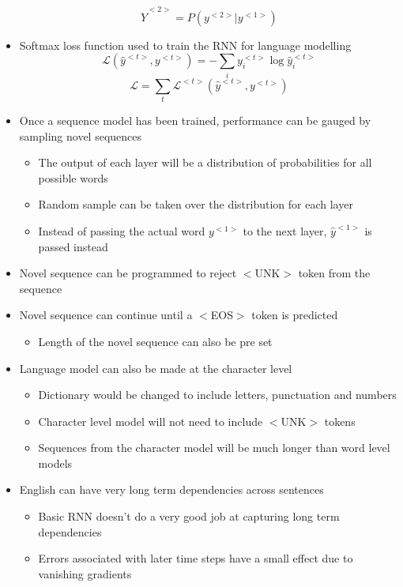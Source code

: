 \documentclass[12pt, letterpaper]{article}
\begin{document}
\begin{itemize}
\begin{itemize}
        \end{itemize}
        $$\hat{Y}^{<2>}=P(y^{<2>}|y^{<1>})$$ 
        \item Softmax loss function used to train the RNN for language modelling
        $$\mathcal{L}(\hat{y}^{<t>},y^{<t>})=-\sum_iy_i^{<t>}\log\hat{y}_i^{<t>}$$ 
        $$\mathcal{L}=\sum_t\mathcal{L}^{<t>}(\hat{y}^{<t>},y^{<t>})$$
        \item Once a sequence model has been trained, performance can be gauged by sampling novel sequences
        \begin{itemize}
            \item The output of each layer will be a distribution of probabilities for all possible words
            \item Random sample can be taken over the distribution for each layer
            \item Instead of passing the actual word $y^{<1>}$ to the next layer, $\hat{y}^{<1>}$ is passed instead
        \end{itemize}
        \item Novel sequence can be programmed to reject $<$UNK$>$ token from the sequence
        \item Novel sequence can continue until a $<$EOS$>$ token is predicted
        \begin{itemize}
            \item Length of the novel sequence can also be pre set
        \end{itemize}
        \item Language model can also be made at the character level
        \begin{itemize}
            \item Dictionary would be changed to include letters, punctuation and numbers 
            \item Character level model will not need to include $<$UNK$>$ tokens
            \item Sequences from the character model will be much longer than word level models
        \end{itemize}
        \item English can have very long term dependencies across sentences 
        \begin{itemize}
            \item Basic RNN doesn't do a very good job at capturing long term dependencies
            \item Errors associated with later time steps have a small effect due to vanishing gradients 

\end{itemize}
\end{itemize}
\end{document}
